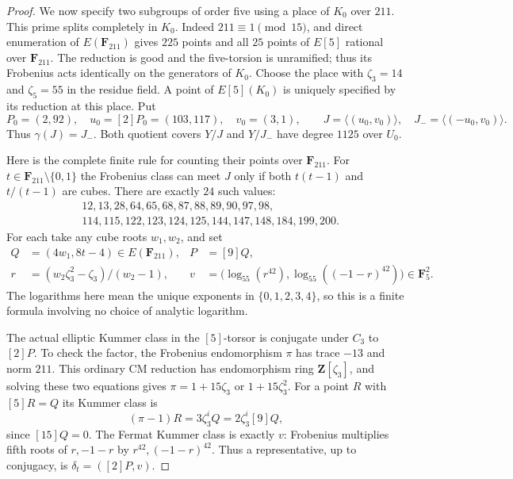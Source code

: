 \documentclass[11pt,oneside]{article}
\begin{document}
\begin{proof}
We now specify two subgroups of order five using a place
of $K_0$ over $211$. This prime splits completely in $K_0$.
Indeed $211\equiv1\pmod{15}$, and direct enumeration of
$E(\mathbf F_{211})$ gives $225$ points and all $25$ points
of $E[5]$ rational over $\mathbf F_{211}$. The reduction
is good and the five-torsion is unramified; thus its
Frobenius acts identically on the generators of $K_0$.
Choose the place with $\zeta_3=14$ and $\zeta_5=55$ in
the residue field. A point of $E[5](K_0)$ is uniquely
specified by its reduction at this place. Put
\[
 P_0=(2,92),\quad u_0=[2]P_0=(103,117),\quad v_0=(3,1),
 \qquad
 J=\langle(u_0,v_0)\rangle,
 \quad J_-=\langle(-u_0,v_0)\rangle.                          \tag{A20}
\]
Thus $\gamma(J)=J_-$. Both quotient covers $Y/J$ and
$Y/J_-$ have degree $1125$ over $U_0$.

Here is the complete finite rule for counting their points
over $\mathbf F_{211}$. For $t\in\mathbf F_{211}\setminus\{0,1\}$
the Frobenius class can meet $J$ only if both $t(t-1)$ and
$t/(t-1)$ are cubes. There are exactly $24$ such values:
\[
\begin{aligned}
 &12,13,28,64,65,68,87,88,89,90,97,98,\\
 &114,115,122,123,124,125,144,147,148,184,199,200.
\end{aligned}                                                   \tag{A21}
\]
For each take any cube roots $w_1,w_2$, and set
\[
 \begin{aligned}
 Q&=(4w_1,8t-4)\in E(\mathbf F_{211}),& P&=[9]Q,\\
 r&=(w_2\zeta_3^2-\zeta_3)/(w_2-1),&
 v&=\bigl(\log_{55}(r^{42}),
             \log_{55}((-1-r)^{42})\bigr)\in\mathbf F_5^2.
 \end{aligned}                                                   \tag{A22}
\]
The logarithms here mean the unique exponents in
$\{0,1,2,3,4\}$, so this is a finite formula involving no
choice of analytic logarithm.

The actual elliptic Kummer class in the $[5]$-torsor is
conjugate under $C_3$ to $[2]P$. To check the factor,
the Frobenius endomorphism $\pi$ has trace $-13$ and
norm $211$. This ordinary CM reduction has endomorphism
ring $\mathbf Z[\zeta_3]$, and solving these two equations
gives $\pi=1+15\zeta_3$ or $1+15\zeta_3^2$. For a point
$R$ with $[5]R=Q$ its Kummer class is
\[
 (\pi-1)R=3\zeta_3^iQ
             =2\zeta_3^i[9]Q,
\]
since $[15]Q=0$. The Fermat Kummer class is exactly $v$:
Frobenius multiplies fifth roots of $r,-1-r$ by
$r^{42},(-1-r)^{42}$. Thus a representative, up to
conjugacy, is $\delta_t=([2]P,v)$.


\end{proof}
\end{document}
